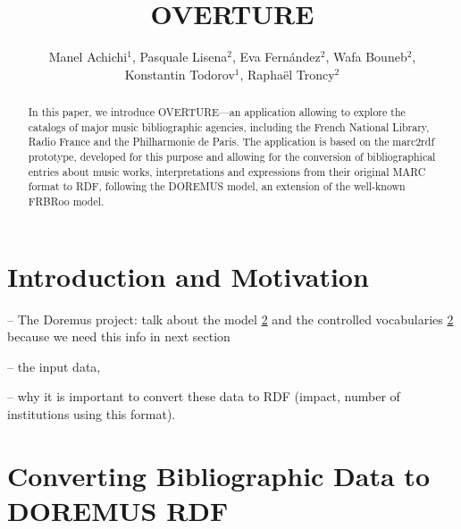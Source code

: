 \documentclass[runningheads,a4paper]{llncs}
\begin{document}
\title{OVERTURE}


\author{Manel Achichi$^1$, Pasquale Lisena$^2$, Eva Fern\'{a}ndez$^2$, Wafa Bouneb$^2$, \\ Konstantin Todorov$^1$, Rapha\"{e}l Troncy$^2$}

\maketitle


\begin{abstract}
In this paper, we introduce OVERTURE---an application allowing to explore the catalogs of major music bibliographic agencies, including the French National Library, Radio France and the Philharmonie de Paris. The application is based on the marc2rdf prototype, developed for this purpose and allowing for the conversion of bibliographical entries about music works, interpretations and expressions from their original MARC format to RDF, following the DOREMUS model, an extension of the well-known FRBRoo model. 

\end{abstract}


\section{Introduction and Motivation}

-- The Doremus project: talk about the model \ref{} and the controlled vocabularies \ref{} because we need this info in next section

-- the input data, 

-- why it is important to convert these data to RDF (impact, number of institutions using this format).


\section{Converting Bibliographic Data to DOREMUS RDF}
\end{document}
